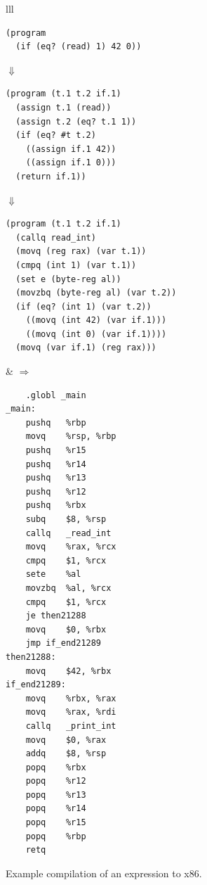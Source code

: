 \documentclass[11pt]{book}
\begin{document}
\begin{figure}[tbp]
\begin{tabular}{lll}
\begin{minipage}{0.5\textwidth}
\begin{lstlisting}
(program
  (if (eq? (read) 1) 42 0))
\end{lstlisting}
$\Downarrow$
\begin{lstlisting}
(program (t.1 t.2 if.1)
  (assign t.1 (read))
  (assign t.2 (eq? t.1 1))
  (if (eq? #t t.2)
    ((assign if.1 42))
    ((assign if.1 0)))
  (return if.1))
\end{lstlisting}
$\Downarrow$
\begin{lstlisting}
(program (t.1 t.2 if.1)
  (callq read_int)
  (movq (reg rax) (var t.1))
  (cmpq (int 1) (var t.1))
  (set e (byte-reg al))
  (movzbq (byte-reg al) (var t.2))
  (if (eq? (int 1) (var t.2))
    ((movq (int 42) (var if.1)))
    ((movq (int 0) (var if.1))))
  (movq (var if.1) (reg rax)))
\end{lstlisting}
\end{minipage}
&
$\Rightarrow$
\begin{minipage}{0.4\textwidth}
\begin{lstlisting}
	.globl _main
_main:
	pushq	%rbp
	movq	%rsp, %rbp
	pushq	%r15
	pushq	%r14
	pushq	%r13
	pushq	%r12
	pushq	%rbx
	subq	$8, %rsp
	callq	_read_int
	movq	%rax, %rcx
	cmpq	$1, %rcx
	sete	%al
	movzbq	%al, %rcx
	cmpq	$1, %rcx
	je then21288
	movq	$0, %rbx
	jmp if_end21289
then21288:
	movq	$42, %rbx
if_end21289:
	movq	%rbx, %rax
	movq	%rax, %rdi
	callq	_print_int
	movq	$0, %rax
	addq	$8, %rsp
	popq	%rbx
	popq	%r12
	popq	%r13
	popq	%r14
	popq	%r15
	popq	%rbp
	retq
\end{lstlisting}
\end{minipage}
\end{tabular}
\caption{Example compilation of an  expression to x86.}
\label{fig:if-example-x86}
\end{figure}
\end{document}
